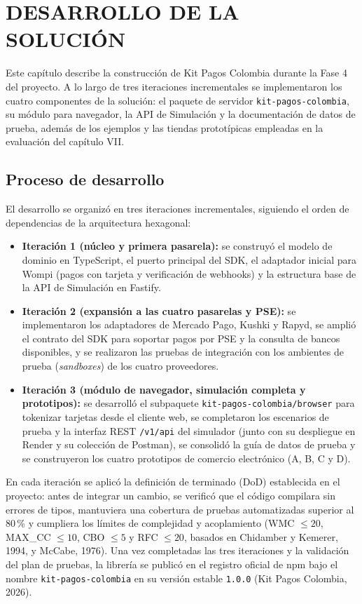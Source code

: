 \setcounter{subsection}{0}
\section{DESARROLLO DE LA SOLUCIÓN}
\sloppy

Este capítulo describe la construcción de Kit Pagos Colombia durante la Fase 4 del proyecto. A lo largo de tres iteraciones incrementales se implementaron los cuatro componentes de la solución: el paquete de servidor \texttt{kit-pagos-colombia}, su módulo para navegador, la API de Simulación y la documentación de datos de prueba, además de los ejemplos y las tiendas prototípicas empleadas en la evaluación del capítulo VII.

\subsection{Proceso de desarrollo}

El desarrollo se organizó en tres iteraciones incrementales, siguiendo el orden de dependencias de la arquitectura hexagonal:
\begin{itemize}
    \item \textbf{Iteración 1 (núcleo y primera pasarela):} se construyó el modelo de dominio en TypeScript, el puerto principal del SDK, el adaptador inicial para Wompi (pagos con tarjeta y verificación de webhooks) y la estructura base de la API de Simulación en Fastify.
    \item \textbf{Iteración 2 (expansión a las cuatro pasarelas y PSE):} se implementaron los adaptadores de Mercado Pago, Kushki y Rapyd, se amplió el contrato del SDK para soportar pagos por PSE y la consulta de bancos disponibles, y se realizaron las pruebas de integración con los ambientes de prueba (\textit{sandboxes}) de los cuatro proveedores.
    \item \textbf{Iteración 3 (módulo de navegador, simulación completa y prototipos):} se desarrolló el subpaquete \texttt{kit-pagos-colombia/browser} para tokenizar tarjetas desde el cliente web, se completaron los escenarios de prueba y la interfaz REST \texttt{/v1/api} del simulador (junto con su despliegue en Render y su colección de Postman), se consolidó la guía de datos de prueba y se construyeron los cuatro prototipos de comercio electrónico (A, B, C y D).
\end{itemize}

En cada iteración se aplicó la definición de terminado (DoD) establecida en el proyecto: antes de integrar un cambio, se verificó que el código compilara sin errores de tipos, mantuviera una cobertura de pruebas automatizadas superior al 80\,\% y cumpliera los límites de complejidad y acoplamiento (WMC $\le 20$, MAX\_CC $\le 10$, CBO $\le 5$ y RFC $\le 20$, basados en Chidamber y Kemerer, 1994, y McCabe, 1976). Una vez completadas las tres iteraciones y la validación del plan de pruebas, la librería se publicó en el registro oficial de npm bajo el nombre \texttt{kit-pagos-colombia} en su versión estable \texttt{1.0.0} (Kit Pagos Colombia, 2026).

